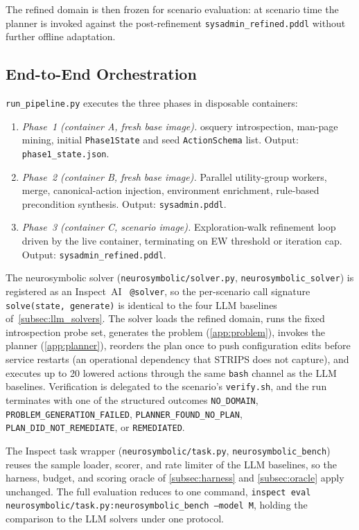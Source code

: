 The refined domain is then frozen for scenario evaluation: at scenario time the planner is invoked against the post-refinement \texttt{sysadmin\_refined.pddl} without further offline adaptation.

\subsection{End-to-End Orchestration}
\label{app:orchestration}

\texttt{run\_pipeline.py} executes the three phases in disposable containers:

\begin{enumerate}
  \item \emph{Phase~1 (container A, fresh base image).} osquery introspection, man-page mining, initial \texttt{Phase1State} and seed \texttt{ActionSchema} list. Output: \texttt{phase1\_state.json}.
  \item \emph{Phase~2 (container B, fresh base image).} Parallel utility-group workers, merge, canonical-action injection, environment enrichment, rule-based precondition synthesis. Output: \texttt{sysadmin.pddl}.
  \item \emph{Phase~3 (container C, scenario image).} Exploration-walk refinement loop driven by the live container, terminating on EW threshold or iteration cap. Output: \texttt{sysadmin\_refined.pddl}.
\end{enumerate}

The neurosymbolic solver (\texttt{neurosymbolic/solver.py}, \texttt{neurosymbolic\_solver}) is registered as an Inspect~AI~\cite{UKAISI2024Inspect} \texttt{@solver}, so the per-scenario call signature \texttt{solve(state, generate)} is identical to the four LLM baselines of~\ref{subsec:llm_solvers}. The solver loads the refined domain, runs the fixed introspection probe set, generates the problem (\ref{app:problem}), invokes the planner (\ref{app:planner}), reorders the plan once to push configuration edits before service restarts (an operational dependency that STRIPS does not capture), and executes up to 20 lowered actions through the same \texttt{bash} channel as the LLM baselines. Verification is delegated to the scenario's \texttt{verify.sh}, and the run terminates with one of the structured outcomes \texttt{NO\_DOMAIN}, \texttt{PROBLEM\_GENERATION\_FAILED}, \texttt{PLANNER\_FOUND\_NO\_PLAN}, \texttt{PLAN\_DID\_NOT\_REMEDIATE}, or \texttt{REMEDIATED}.

The Inspect task wrapper (\texttt{neurosymbolic/task.py}, \texttt{neurosymbolic\_bench}) reuses the sample loader, scorer, and rate limiter of the LLM baselines, so the harness, budget, and scoring oracle of \ref{subsec:harness} and \ref{subsec:oracle} apply unchanged. The full evaluation reduces to one command, \texttt{inspect eval neurosymbolic/task.py:neurosymbolic\_bench --model M}, holding the comparison to the LLM solvers under one protocol.


